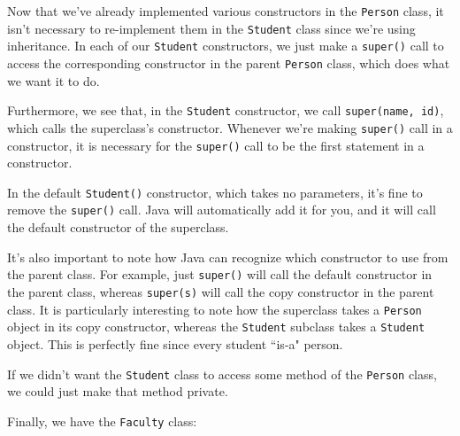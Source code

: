 Now that we've already implemented various constructors in the \verb!Person! class, it isn't necessary to re-implement them in the \verb!Student! class since we're using inheritance. In each of our \verb!Student! constructors, we just make a \verb!super()! call to access the corresponding constructor in the parent \verb!Person! class, which does what we want it to do.

Furthermore, we see that, in the \verb!Student! constructor, we call \verb!super(name, id)!, which calls the superclass's constructor. Whenever we're making \verb!super()! call in a constructor, it is necessary for the \verb!super()! call to be the first statement in a constructor. 


In the default \verb!Student()! constructor, which takes no parameters, it's fine to remove the \verb!super()! call. Java will automatically add it for you, and it will call the default constructor of the superclass. 


It's also important to note how Java can recognize which constructor to use from the parent class. For example, just \verb!super()! will call the default constructor in the parent class, whereas \verb!super(s)! will call the copy constructor in the parent class. It is particularly interesting to note how the superclass takes a \verb!Person! object in its copy constructor, whereas the \verb!Student! subclass takes a \verb!Student! object. This is perfectly fine since every student ``is-a" person. 


If we didn't want the \verb!Student! class to access some method of the \verb!Person! class, we could just make that method private.



Finally, we have the \verb!Faculty! class:


